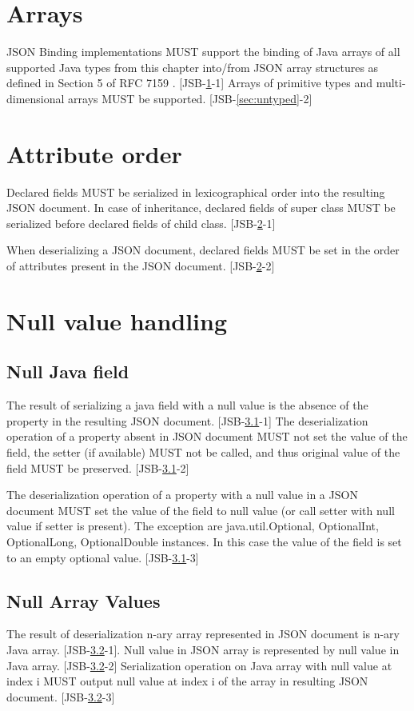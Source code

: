 \section{Arrays}
\label{sec:arrays}
JSON Binding implementations MUST support the binding of Java arrays of all supported Java types from this chapter into/from JSON array structures as defined in Section 5 of RFC 7159 \cite{rfc7159}. [JSB-\ref{sec:arrays}-1] Arrays of primitive types and multi-dimensional arrays MUST be supported. [JSB-\ref{sec:untyped}-2]

\section{Attribute order}
\label{sec:attributes}

Declared fields MUST be serialized in lexicographical order into the resulting JSON document. In case of inheritance, declared fields of super class MUST be serialized before declared fields of child class. [JSB-\ref{sec:attributes}-1]

When deserializing a JSON document, declared fields MUST be set in the order of attributes present in the JSON document. [JSB-\ref{sec:attributes}-2]

\section{Null value handling}
\label{sec:null}

\subsection{Null Java field}
\label{subsec:nullfield}
The result of serializing a java field with a null value is the absence of the property in the resulting JSON document. [JSB-\ref{subsec:nullfield}-1]
The deserialization operation of a property absent in JSON document MUST not set the value of the field, the setter (if available) MUST not be called, and thus original value of the field MUST be preserved. [JSB-\ref{subsec:nullfield}-2]

The deserialization operation of a property with a null value in a JSON document MUST set the value of the field to null value (or call setter with null value if setter is present). The exception are java.util.Optional, OptionalInt, OptionalLong, OptionalDouble instances. In this case the value of the field is set to an empty optional value. [JSB-\ref{subsec:nullfield}-3]

\subsection{Null Array Values}
\label{subsec:nullarray}
The result of deserialization n-ary array represented in JSON document is n-ary Java array. [JSB-\ref{subsec:nullarray}-1]. Null value in JSON array is represented by null value in Java array. [JSB-\ref{subsec:nullarray}-2]
Serialization operation on Java array with null value at index i MUST output null value at index i of the array in resulting JSON document. [JSB-\ref{subsec:nullarray}-3]

